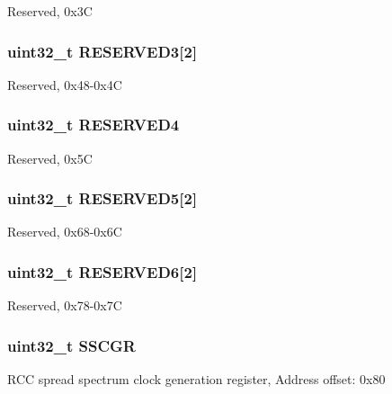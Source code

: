Reserved, 0x3\-C \hypertarget{struct_r_c_c___type_def_ab6f0f833dbe064708de75d95c68c32fd}{
\subsubsection[{R\-E\-S\-E\-R\-V\-E\-D3}]{\setlength{\rightskip}{0pt plus 5cm}uint32\-\_\-t R\-E\-S\-E\-R\-V\-E\-D3\mbox{[}2\mbox{]}}}\label{struct_r_c_c___type_def_ab6f0f833dbe064708de75d95c68c32fd}
Reserved, 0x48-\/0x4\-C \hypertarget{struct_r_c_c___type_def_ac0018930ee9f18afda25b695b9a4ec16}{
\subsubsection[{R\-E\-S\-E\-R\-V\-E\-D4}]{\setlength{\rightskip}{0pt plus 5cm}uint32\-\_\-t R\-E\-S\-E\-R\-V\-E\-D4}}\label{struct_r_c_c___type_def_ac0018930ee9f18afda25b695b9a4ec16}
Reserved, 0x5\-C \hypertarget{struct_r_c_c___type_def_ac0eb05794aeee3b4ed69c8fe54c9be3b}{
\subsubsection[{R\-E\-S\-E\-R\-V\-E\-D5}]{\setlength{\rightskip}{0pt plus 5cm}uint32\-\_\-t R\-E\-S\-E\-R\-V\-E\-D5\mbox{[}2\mbox{]}}}\label{struct_r_c_c___type_def_ac0eb05794aeee3b4ed69c8fe54c9be3b}
Reserved, 0x68-\/0x6\-C \hypertarget{struct_r_c_c___type_def_a10da398d74a1f88d5b42bd40718d9447}{
\subsubsection[{R\-E\-S\-E\-R\-V\-E\-D6}]{\setlength{\rightskip}{0pt plus 5cm}uint32\-\_\-t R\-E\-S\-E\-R\-V\-E\-D6\mbox{[}2\mbox{]}}}\label{struct_r_c_c___type_def_a10da398d74a1f88d5b42bd40718d9447}
Reserved, 0x78-\/0x7\-C \hypertarget{struct_r_c_c___type_def_aaef3da59eaf7c6dfdf9a12fd60ce58a8}{
\subsubsection[{S\-S\-C\-G\-R}]{ uint32\-\_\-t S\-S\-C\-G\-R}}\label{struct_r_c_c___type_def_aaef3da59eaf7c6dfdf9a12fd60ce58a8}
R\-C\-C spread spectrum clock generation register, Address offset\-: 0x80 

